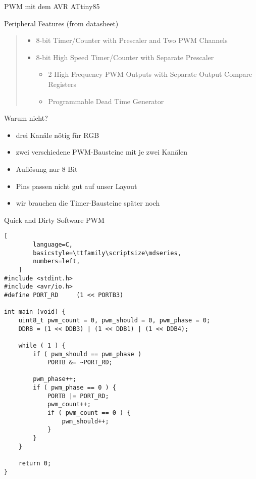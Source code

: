 \documentclass{beamer}
\begin{document}
\begin{frame}{PWM mit dem AVR ATtiny85}
    \begin{block}{Peripheral Features (from datasheet)}
        \begin{quote}
            \begin{itemize}
                \item 8-bit Timer/Counter with Prescaler and Two PWM Channels
                \item 8-bit High Speed Timer/Counter with Separate Prescaler
                    \begin{itemize}
                        \item 2 High Frequency PWM Outputs with Separate Output Compare Registers
                        \item Programmable Dead Time Generator
                    \end{itemize}
            \end{itemize}
        \end{quote}
    \end{block}
    \pause
    \begin{block}{Warum nicht?}
        \begin{itemize}
            \item drei Kanäle nötig für RGB
            \item zwei verschiedene PWM-Bausteine mit je zwei Kanälen
            \item Auflösung nur 8 Bit
            \item Pins passen nicht gut auf unser Layout
            \item wir brauchen die Timer-Bausteine später noch
        \end{itemize}
    \end{block}
\end{frame}

\begin{frame}[fragile]{Quick and Dirty Software PWM}
    \begin{lstlisting}[
        language=C,
        basicstyle=\ttfamily\scriptsize\mdseries,
        numbers=left,
    ]
#include <stdint.h>
#include <avr/io.h>
#define PORT_RD     (1 << PORTB3)

int main (void) {
    uint8_t pwm_count = 0, pwm_should = 0, pwm_phase = 0;
    DDRB = (1 << DDB3) | (1 << DDB1) | (1 << DDB4);

    while ( 1 ) {
        if ( pwm_should == pwm_phase )
            PORTB &= ~PORT_RD;

        pwm_phase++;
        if ( pwm_phase == 0 ) {
            PORTB |= PORT_RD;
            pwm_count++;
            if ( pwm_count == 0 ) {
                pwm_should++;
            }
        }
    }

    return 0;
}
    \end{lstlisting}
\end{frame}
\end{document}
